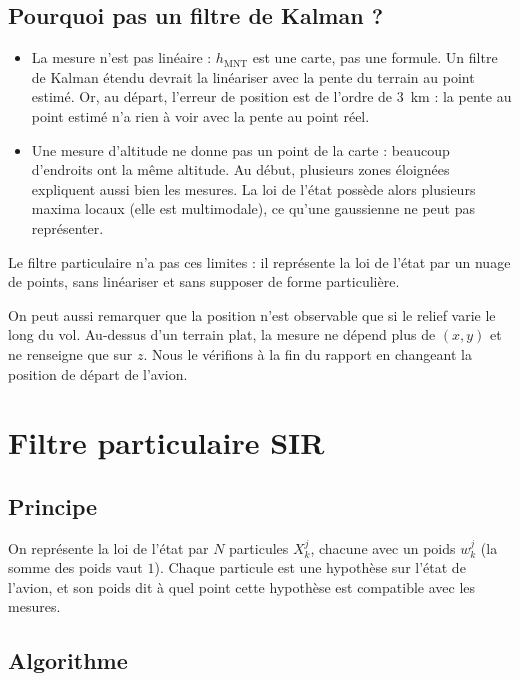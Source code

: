 \documentclass[11pt]{article}
\begin{document}
\subsection{Pourquoi pas un filtre de Kalman ?}

\begin{itemize}
\item La mesure n'est pas linéaire : $h_{\mathrm{MNT}}$ est une carte, pas une formule.
Un filtre de Kalman étendu devrait la linéariser avec la pente du terrain au point
estimé. Or, au départ, l'erreur de position est de l'ordre de $3$~km : la pente au point
estimé n'a rien à voir avec la pente au point réel.
\item Une mesure d'altitude ne donne pas un point de la carte : beaucoup d'endroits
ont la même altitude. Au début, plusieurs zones éloignées expliquent aussi bien les
mesures. La loi de l'état possède alors plusieurs maxima locaux (elle est multimodale),
ce qu'une gaussienne ne peut pas représenter.
\end{itemize}

Le filtre particulaire n'a pas ces limites : il représente la loi de l'état par un
nuage de points, sans linéariser et sans supposer de forme particulière.

On peut aussi remarquer que la position n'est observable que si le relief varie le
long du vol. Au-dessus d'un terrain plat, la mesure ne dépend plus de $(x, y)$ et ne
renseigne que sur $z$. Nous le vérifions à la fin du rapport en changeant la position
de départ de l'avion.

\section{Filtre particulaire SIR}

\subsection{Principe}

On représente la loi de l'état par $N$ particules $X_k^j$, chacune avec un poids
$w_k^j$ (la somme des poids vaut $1$). Chaque particule est une hypothèse sur l'état de
l'avion, et son poids dit à quel point cette hypothèse est compatible avec les mesures.

\subsection{Algorithme}
\end{document}

